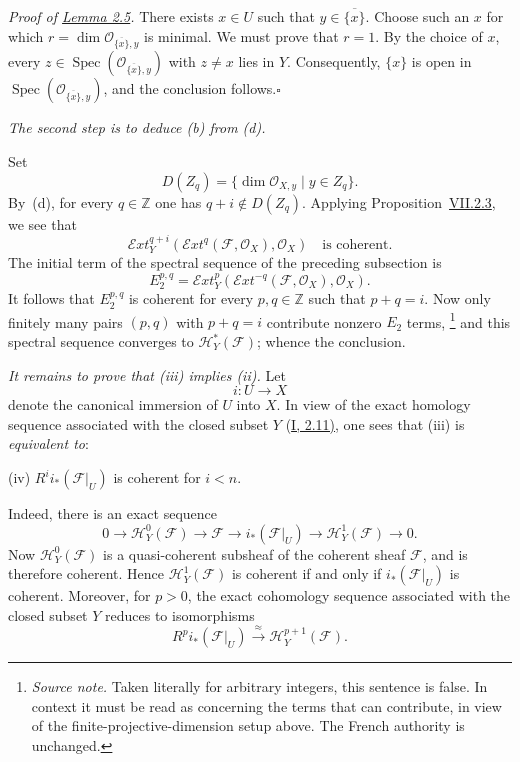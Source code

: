 \documentclass[11pt,a4paper,oneside]{book}
\providecommand{\sisi}[2]{#2}
\providecommand{\markedfootnote}[2]{%
  \begingroup\renewcommand{\thefootnote}{#1}\footnote{#2}\endgroup}
\providecommand{\sH}{\mathcal H}
\providecommand{\sExt}{\mathcal E\!xt}
\providecommand{\cF}{\mathcal F}
\providecommand{\cO}{\mathcal O}
\providecommand{\Spec}{\operatorname{Spec}}
\theoremstyle{plain}
\theoremstyle{definition}
\theoremstyle{remark}
\begin{document}
\medskip
\noindent\textit{Proof of \hyperref[VIII.2.5]{Lemma 2.5}.} There exists $x\in U$ such that
$y\in\overline{\{x\}}$. Choose such an $x$ for which
$r=\dim\cO_{\overline{\{x\}},y}$ is minimal. We must prove that $r=1$.
By the choice of $x$, every
$z\in\Spec(\cO_{\overline{\{x\}},y})$ with $z\ne x$ lies in $Y$.
Consequently, $\{x\}$ is open in
$\Spec(\cO_{\overline{\{x\}},y})$, and the conclusion follows.\hfill$\square$


\medskip
\noindent\textit{The second step is to deduce \textup{(b)} from
\textup{(d)}.}

\medskip
Set
\[
  D(Z_q)=\{\dim\cO_{X,y}\mid y\in Z_q\}.
\]
By~\textup{(d)}, for every $q\in\mathbb Z$ one has
$q+i\notin D(Z_q)$. Applying Proposition~\hyperref[VII.2.3]{VII.2.3}, we see that
\[
  \sExt_Y^{q+i}(\sExt^q(\cF,\cO_X),\cO_X)
  \quad\text{is coherent.}
\]
The initial term of the spectral sequence of the preceding subsection is
\[
  E_2^{p,q}
  =\sExt_Y^p(\sExt^{-q}(\cF,\cO_X),\cO_X).
\]
It follows that $E_2^{p,q}$ is coherent for every $p,q\in\mathbb Z$ such
that $p+q=i$. Now \sisi{there are only finitely many pairs $(p,q)$ such that
$p+q=i$}{only finitely many pairs $(p,q)$ with $p+q=i$ contribute nonzero $E_2$ terms},\markedfootnote{[S]}{\textit{Source note.} Taken literally for
arbitrary integers, this sentence is false. In context it must be read as
concerning the terms that can contribute, in view of the finite-projective-dimension
setup above. The French authority is unchanged.} and this spectral
sequence converges to $\sH_Y^\ast(\cF)$; whence the conclusion.


\medskip
\noindent\textit{It remains to prove that \textup{(iii)} implies
\textup{(ii)}.} Let
\[
  i\colon U\longrightarrow X
\]
denote the canonical immersion of $U$ into $X$. In view of the exact homology
sequence associated with the closed subset $Y$ (\hyperref[I.2.11]{I, 2.11)}, one sees that
\textup{(iii)} is \textit{equivalent to}:

\medskip
\noindent\textup{(iv)} $R^i i_*(\cF|_U)$ is coherent for $i<n$.
\label{condition}

\medskip
{}\quad Indeed, there is
an exact sequence
\[
  0\longrightarrow \sH_Y^0(\cF)\longrightarrow \cF
  \longrightarrow i_*(\cF|_U)\longrightarrow \sH_Y^1(\cF)
  \longrightarrow 0.
\]
Now $\sH_Y^0(\cF)$ is a quasi-coherent subsheaf of the coherent sheaf $\cF$,
and is therefore coherent. Hence $\sH_Y^1(\cF)$ is coherent if and only if
$i_*(\cF|_U)$ is coherent. Moreover, for $p>0$, the exact cohomology sequence
associated with the closed subset $Y$ reduces to isomorphisms
\[
  R^p i_*(\cF|_U)\overset{\approx}{\longrightarrow}\sH_Y^{p+1}(\cF).
\]
\end{document}
